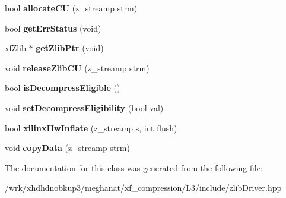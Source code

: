 \begin{DoxyCompactItemize}
\item 
\hypertarget{classzlibDriver_ab92f52f879fce464cf131f21540c82f6}{bool {\bfseries allocate\-C\-U} (z\-\_\-streamp strm)}\label{classzlibDriver_ab92f52f879fce464cf131f21540c82f6}

\item 
\hypertarget{classzlibDriver_ab291d3ab12bd571c59d2e46171230933}{bool {\bfseries get\-Err\-Status} (void)}\label{classzlibDriver_ab291d3ab12bd571c59d2e46171230933}

\item 
\hypertarget{classzlibDriver_ad141f629c1225a8254848407dc4ecf96}{\hyperlink{classxf_1_1compression_1_1xfZlib}{xf\-Zlib} $\ast$ {\bfseries get\-Zlib\-Ptr} (void)}\label{classzlibDriver_ad141f629c1225a8254848407dc4ecf96}

\item 
\hypertarget{classzlibDriver_a7ab5372e9a3ed91d0496365d7575c5b4}{void {\bfseries release\-Zlib\-C\-U} (z\-\_\-streamp strm)}\label{classzlibDriver_a7ab5372e9a3ed91d0496365d7575c5b4}

\item 
\hypertarget{classzlibDriver_a95aa0cb5cbfb47555669a1d80d01e41d}{bool {\bfseries is\-Decompress\-Eligible} ()}\label{classzlibDriver_a95aa0cb5cbfb47555669a1d80d01e41d}

\item 
\hypertarget{classzlibDriver_a7c213382833f41d525be9075e3a95785}{void {\bfseries set\-Decompress\-Eligibility} (bool val)}\label{classzlibDriver_a7c213382833f41d525be9075e3a95785}

\item 
\hypertarget{classzlibDriver_a857c13e4ee000ab2d8019480642113ba}{bool {\bfseries xilinx\-Hw\-Inflate} (z\-\_\-streamp s, int flush)}\label{classzlibDriver_a857c13e4ee000ab2d8019480642113ba}

\item 
\hypertarget{classzlibDriver_a86000ba72a29785a371f7f8da08a7a8f}{void {\bfseries copy\-Data} (z\-\_\-streamp strm)}\label{classzlibDriver_a86000ba72a29785a371f7f8da08a7a8f}

\end{DoxyCompactItemize}


The documentation for this class was generated from the following file\-:\begin{DoxyCompactItemize}
\item 
/wrk/xhdhdnobkup3/meghanat/xf\-\_\-compression/\-L3/include/zlib\-Driver.\-hpp\end{DoxyCompactItemize}

